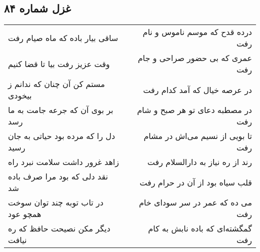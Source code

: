 \begin{center}
\section*{غزل شماره ۸۴}
\label{sec:sh084}
\begin{longtable}{l p{0.5cm} r}
ساقی بیار باده که ماه صیام رفت
&&
درده قدح که موسم ناموس و نام رفت
\\
وقت عزیز رفت بیا تا قضا کنیم
&&
عمری که بی حضور صراحی و جام رفت
\\
مستم کن آن چنان که ندانم ز بیخودی
&&
در عرصه خیال که آمد کدام رفت
\\
بر بوی آن که جرعه جامت به ما رسد
&&
در مصطبه دعای تو هر صبح و شام رفت
\\
دل را که مرده بود حیاتی به جان رسید
&&
تا بویی از نسیم می‌اش در مشام رفت
\\
زاهد غرور داشت سلامت نبرد راه
&&
رند از ره نیاز به دارالسلام رفت
\\
نقد دلی که بود مرا صرف باده شد
&&
قلب سیاه بود از آن در حرام رفت
\\
در تاب توبه چند توان سوخت همچو عود
&&
می ده که عمر در سر سودای خام رفت
\\
دیگر مکن نصیحت حافظ که ره نیافت
&&
گمگشته‌ای که باده نابش به کام رفت
\\
\end{longtable}
\end{center}
